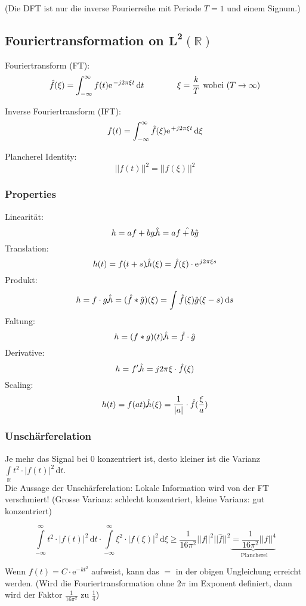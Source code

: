(Die DFT ist nur die inverse Fourierreihe mit Periode $T=1$ und einem Signum.)

\newpage
\subsection{Fouriertransformation on $\mathbf{L^2(\mathbb{R})}$}

Fouriertransform (FT): \[ \hat{f}(\xi) = \int_{-\infty}^{\infty}f(t) \e^{-j 2\pi \xi t} \, \mathrm{d}t \qquad \qquad \xi = \frac{k}{T} \text{ wobei } (T \rightarrow \infty) \]

Inverse Fouriertransform (IFT): \[ f(t) = \int_{-\infty}^{\infty}\hat{f}(\xi) \e^{+j 2\pi \xi t} \, \mathrm{d}\xi \]

Plancherel Identity: \[ ||f(t)||^2 = ||\hat{f}(\xi)||^2 \]

\subsubsection{Properties}
Linearität: \[ h = af + bg \FT \hat{h} = a\hat{f + b\hat{g}} \]
Translation: \[ h(t) = f(t+s) \FT \hat{h}(\xi) = \hat{f}(\xi) \cdot \e^{j2\pi\xi s} \]
Produkt: \[ h = f \cdot g \FT \hat{h} = (\hat{f}\ast\hat{g})(\xi) = \int \hat{f}(\xi) \hat{g}(\xi - s) \,\mathrm{d}s \]
Faltung: \[ h = (f\ast g)(t) \FT \hat{h} = \hat{f} \cdot \hat{g} \]
Derivative: \[ h = f' \FT \hat{h} = j2\pi\xi\cdot\hat{f}(\xi) \]
Scaling: \[ h(t) = f(at) \FT \hat{h}(\xi) = \frac{1}{|a|} \cdot \hat{f}(\frac{\xi}{a}) \]

\subsubsection{Unschärferelation}
Je mehr das Signal bei 0 konzentriert ist, desto kleiner ist die Varianz $\int\limits_{\mathbb{R}} t^2 \cdot |f(t)|^2 \,\mathrm{d}t$.\\
Die Aussage der Unschärferelation: Lokale Information wird von der FT verschmiert!
(Grosse Varianz: schlecht konzentriert, kleine Varianz: gut konzentriert)

\[  
	\int\limits_{-\infty}^\infty t^2 \cdot |f(t)|^2 \, \mathrm{d}t \cdot \int\limits_{-\infty}^\infty \xi^2 \cdot |f(\xi)|^2 \, \mathrm{d}\xi
	\geq \frac{1}{16 \pi^2} ||f||^2||\hat{f}||^2 \underbrace{= \frac{1}{16 \pi^2} ||f||^4}_{\text{ Plancherel}}
\]

Wenn $f(t)=C \cdot \mathrm{e}^{-kt^2}$ aufweist, kann das $=$ in der obigen Ungleichung erreicht werden. (Wird die Fouriertransformation ohne $2\pi$ im Exponent definiert, dann wird der Faktor $\frac{1}{16\pi^2}$ zu $\frac{1}{4}$)

